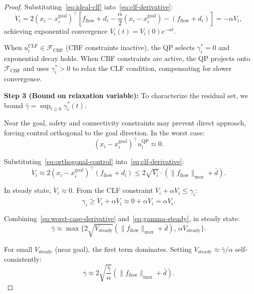 \begin{proof}
Substituting~\eqref{eq:ideal-clf} into~\eqref{eq:clf-derivative}:
\begin{equation}
\dot{V}_i = 2(x_i-x_i^{\mathrm{goal}})^\top\left[f_{\mathrm{flow}}+d_i-\frac{\alpha}{2}(x_i-x_i^{\mathrm{goal}})-(f_{\mathrm{flow}}+d_i)\right] = -\alpha V_i,
\label{eq:exponential-clf}
\end{equation}
achieving exponential convergence $V_i(t)=V_i(0)e^{-\alpha t}$.

When $u_i^{\mathrm{CLF}}\in\mathcal{F}_{\mathrm{CBF}}$ (CBF constraints inactive), the QP selects $\gamma_i^*=0$ and exponential decay holds. When CBF constraints are active, the QP projects onto $\mathcal{F}_{\mathrm{CBF}}$ and uses $\gamma_i^*>0$ to relax the CLF condition, compensating for slower convergence.

\medskip
\noindent\textbf{Step 3 (Bound on relaxation variable):}
To characterize the residual set, we bound $\bar{\gamma}=\sup_{t\ge 0}\gamma_i^*(t)$.

Near the goal, safety and connectivity constraints may prevent direct approach, forcing control orthogonal to the goal direction. In the worst case:
\begin{equation}
(x_i-x_i^{\mathrm{goal}})^\top u_i^{\mathrm{QP}} \approx 0.
\label{eq:orthogonal-control}
\end{equation}

Substituting~\eqref{eq:orthogonal-control} into~\eqref{eq:clf-derivative}:
\begin{equation}
\dot{V}_i \approx 2(x_i-x_i^{\mathrm{goal}})^\top(f_{\mathrm{flow}}+d_i) \le 2\sqrt{V_i}\cdot(\|f_{\mathrm{flow}}\|_{\max}+\bar{d}).
\label{eq:worst-case-derivative}
\end{equation}

In steady state, $\dot{V}_i\approx 0$. From the CLF constraint $\dot{V}_i+\alpha V_i\le\gamma_i$:
\begin{equation}
\gamma_i \ge \dot{V}_i+\alpha V_i \approx 0+\alpha V_i = \alpha V_i.
\label{eq:gamma-steady}
\end{equation}

Combining~\eqref{eq:worst-case-derivative} and~\eqref{eq:gamma-steady}, in steady state:
\begin{equation}
\bar{\gamma} \approx \max\{2\sqrt{V_{\mathrm{steady}}}(\|f_{\mathrm{flow}}\|_{\max}+\bar{d}),\,\alpha V_{\mathrm{steady}}\}.
\label{eq:gamma-bound}
\end{equation}

For small $V_{\mathrm{steady}}$ (near goal), the first term dominates. Setting $V_{\mathrm{steady}}\approx\bar{\gamma}/\alpha$ self-consistently:
\begin{equation}
\bar{\gamma} \approx 2\sqrt{\frac{\bar{\gamma}}{\alpha}}(\|f_{\mathrm{flow}}\|_{\max}+\bar{d}).
\label{eq:self-consistent}
\end{equation}


\end{proof}
